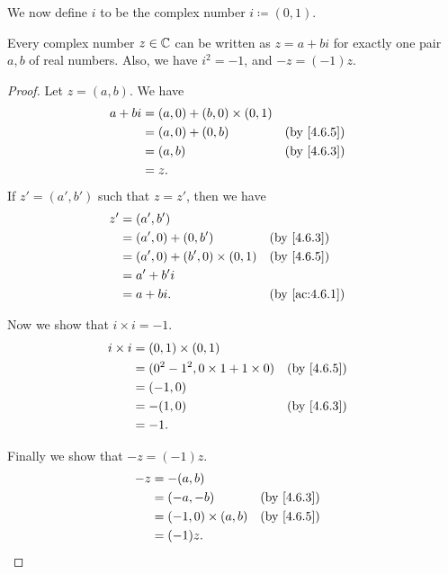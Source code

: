 \begin{note}
  We now define \(i\) to be the complex number \(i \coloneqq (0, 1)\).
\end{note}

\begin{lem}\label{4.6.7}
  Every complex number \(z \in \mathbb{C}\) can be written as \(z = a + bi\) for exactly one pair \(a, b\) of real numbers.
  Also, we have \(i^2 = -1\), and \(-z = (-1)z\).
\end{lem}

\begin{proof}
  Let \(z = (a, b)\).
  We have
  \begin{align*}
    a + bi & = (a, 0) + (b, 0) \times (0, 1)                               \\
           & = (a, 0) + (0, b)               &  & \text{(by \cref{4.6.5})} \\
           & = (a, b)                        &  & \text{(by \cref{4.6.3})} \\
           & = z.
  \end{align*}
  If \(z' = (a', b')\) such that \(z = z'\), then we have
  \begin{align*}
    z' & = (a', b')                                                         \\
       & = (a', 0) + (0, b')               &  & \text{(by \cref{4.6.3})}    \\
       & = (a', 0) + (b', 0) \times (0, 1) &  & \text{(by \cref{4.6.5})}    \\
       & = a' + b' i                                                        \\
       & = a + bi.                         &  & \text{(by \cref{ac:4.6.1})}
  \end{align*}

  Now we show that \(i \times i = -1\).
  \begin{align*}
    i \times i & = (0, 1) \times (0, 1)                                               \\
               & = (0^2 - 1^2, 0 \times 1 + 1 \times 0) &  & \text{(by \cref{4.6.5})} \\
               & = (-1, 0)                                                            \\
               & = -(1, 0)                              &  & \text{(by \cref{4.6.3})} \\
               & = -1.
  \end{align*}

  Finally we show that \(-z = (-1) z\).
  \begin{align*}
    -z & = -(a, b)                                             \\
       & = (-a, -b)              &  & \text{(by \cref{4.6.3})} \\
       & = (-1, 0) \times (a, b) &  & \text{(by \cref{4.6.5})} \\
       & = (-1) z.
  \end{align*}
\end{proof}

